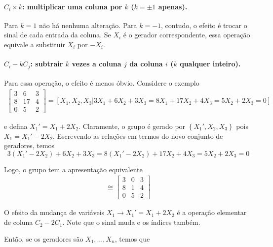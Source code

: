 \documentclass[a4paper,portuguese,11pt,twoside, leqno]{book}
\theoremstyle{definition}
\begin{document}
	\paragraph{$C_i\times k$: multiplicar uma coluna por $k$ ($k=\pm1$ apenas).} Para $k=1$ não há nenhuma alteração. Para $k=-1$, contudo, o efeito é trocar o sinal de cada entrada da coluna. Se $X_i$ é o gerador correspondente, essa operação equivale a substituir $X_i$ por $-X_i$.
	\paragraph{$C_i - kC_j$: subtrair $k$ vezes a coluna $j$ da coluna $i$ ($k$ qualquer inteiro).} Para essa operação, o efeito é menos óbvio. Considere o exemplo
	\begin{align*}
	\begin{bmatrix}
	3 & 6 & 3 \\
	8 & 17 & 4 \\
	0 & 5 & 2
	\end{bmatrix} = [X_1, X_2, X_3 \vert 3X_1 + 6X_2 + 3X_3 = 8X_1 + 17X_2 + 4X_3 = 5X_2 + 2X_3 = 0] 
	\end{align*}
	\par\vspace{0.3cm} e defina $X_1' = X_1+2X_2$. Claramente, o grupo é gerado por $\left\{ X_1', X_2, X_3 \right\}$ pois $X_1 = X_1' - 2X_2$. Escrevendo as relações em termos do novo conjunto de geradores, temos
	\begin{equation*}
	3(X_1' - 2X_2) + 6X_2  + 3X_3 = 8(X_1' - 2X_2) + 17X_2 + 4X_3 = 5X_2 + 2X_3 = 0
	\end{equation*} 
	\par\vspace{0.3cm} Logo, o grupo tem a apresentação equivalente
	\begin{align*}
	[X_1', X_2, X_3 \vert 3X_1' + 3X_3 = 8X_1' + X_2 + 4X_3 = 5X_2 + 2X_3 = 0] \cong \begin{bmatrix}
	3 & 0 & 3 \\
	8 & 1 & 4  \\
	0 & 5 & 2
	\end{bmatrix}
	\end{align*}
	\par\vspace{0.3cm} O efeito da mudança de variáveis $X_1\to X_1' = X_1 + 2X_2$ é a operação elementar de coluna $C_2 - 2C_1$. Note que o sinal muda e os índices também.
	\par\vspace{0.3cm} Então, se os geradores são $X_1, \dots, X_n$, temos que
\end{document}
